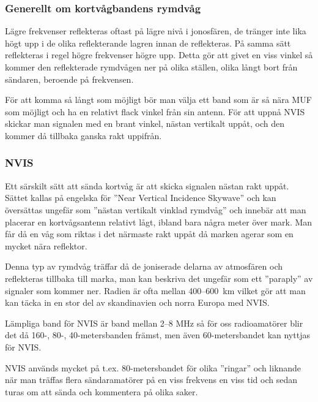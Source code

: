 \subsubsection{Generellt om kortvågbandens rymdvåg}

Lägre frekvenser reflekteras oftast på lägre nivå i jonosfären, de tränger inte lika högt upp i de olika reflekterande lagren innan de reflekteras. På samma sätt reflekteras i regel högre frekvenser högre upp. Detta gör att givet en viss vinkel så kommer den reflekterade rymdvågen ner på olika ställen, olika långt bort från sändaren, beroende på frekvensen. 

För att komma så långt som möjligt bör man välja ett band som är så nära MUF som möjligt och ha en relativt flack vinkel från sin antenn. För att uppnå NVIS skickar man signalen med en brant vinkel, nästan vertikalt uppåt, och den kommer då tillbaka ganska rakt uppifrån.

\subsubsection{NVIS}

Ett särskilt sätt att sända kortvåg är att skicka signalen nästan rakt uppåt. Sättet kallas på engelska för ''Near Vertical Incidence Skywave'' och kan översättas ungefär som ''nästan vertikalt vinklad rymdvåg'' och innebär att man placerar en kortvågsantenn relativt lågt, ibland bara några meter över mark. Man får då en våg som riktas i det närmaste rakt uppåt då marken agerar som en mycket nära reflektor.

Denna typ av rymdvåg träffar då de joniserade delarna av atmosfären och reflekteras tillbaka till marka, man kan beskriva det ungefär som ett ''paraply'' av signaler som kommer ner. Radien är ofta mellan 400--600~km vilket gör att man kan täcka in en stor del av skandinavien och norra Europa med NVIS.

Lämpliga band för NVIS är band mellan 2--8 MHz så för oss radioamatörer blir det då 160-, 80-, 40-metersbanden främst, men även 60-metersbandet kan nyttjas för NVIS.


NVIS används mycket på t.ex. 80-metersbandet för olika ''ringar'' och liknande när man träffas flera sändaramatörer på en viss frekvens en viss tid och sedan turas om att sända och kommentera på olika saker. 

